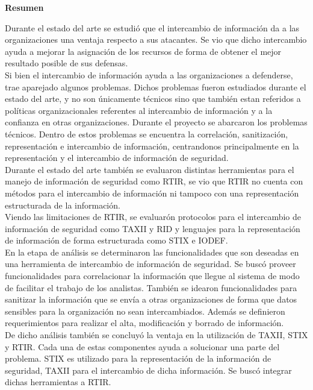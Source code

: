 {\huge \bfseries Resumen \\[0.4cm]}

Durante el estado del arte se estudió que el intercambio de información da a las organizaciones una ventaja respecto a sus atacantes. Se vio que dicho intercambio ayuda a mejorar la asignación de los recursos de forma de obtener el mejor resultado posible de sus defensas. \\

Si bien el intercambio de información ayuda a las organizaciones a defenderse, trae aparejado algunos problemas. Dichos problemas fueron estudiados durante el estado del arte, y no son únicamente técnicos sino que también estan referidos a políticas organizacionales referentes al intercambio de información y a la confianza en otras organizaciones. Durante el proyecto se abarcaron los problemas técnicos. Dentro de estos problemas se encuentra la correlación, sanitización, representación e intercambio de información, centrandonos principalmente en la representación y el intercambio de información de seguridad. \\

Durante el estado del arte también se evaluaron distintas herramientas para el manejo de información de seguridad como RTIR, se vio que RTIR no cuenta con métodos para el intercambio de información ni tampoco con una representación estructurada de la información. \\

Viendo las limitaciones de RTIR, se evaluarón protocolos para el intercambio de información de seguridad como TAXII y RID y lenguajes para la representación de información de forma estructurada como STIX e IODEF. \\

En la etapa de análisis se determinaron las funcionalidades que son deseadas en una herramienta de intercambio de información de seguridad. Se buscó proveer funcionalidades para correlacionar la información que llegue al sistema de modo de facilitar el trabajo de los analistas. También se idearon funcionalidades para sanitizar la información que se envía a otras organizaciones de forma que datos sensibles para la organización no sean intercambiados. Además se definieron requerimientos para realizar el alta, modificación y borrado de información. \\

De dicho análisis también se concluyó la ventaja en la utilización de TAXII, STIX y RTIR. Cada una de estas componentes ayuda a solucionar una parte del problema. STIX es utilizado para la representación de la información de seguridad, TAXII para el intercambio de dicha información. Se buscó integrar dichas herramientas a RTIR. \\

